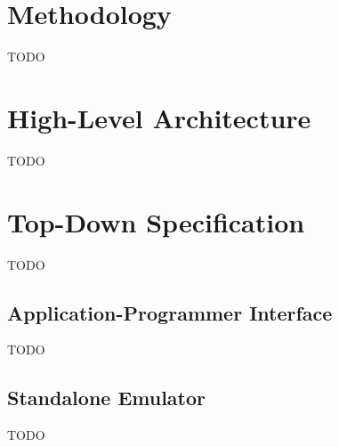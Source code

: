 \section{Methodology}

TODO

\section{High-Level Architecture}

TODO

\section{Top-Down Specification}

TODO

\subsection{Application-Programmer Interface}

TODO

\subsection{Standalone Emulator}

TODO
